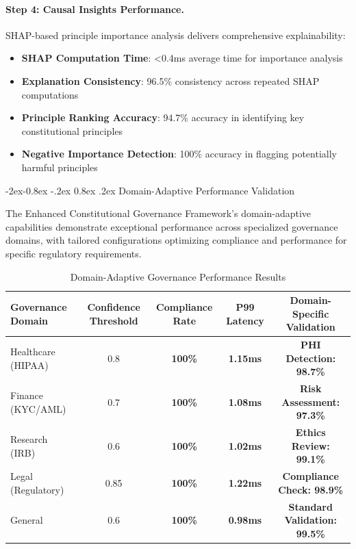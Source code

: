 \documentclass[manuscript,screen,9pt]{acmart}
\makeatletter
\renewcommand\subsubsection{\@startsection{subsubsection}{3}{\z@}%
  {-2ex\@plus -0.8ex \@minus -.2ex}%
  {0.8ex \@plus .2ex}%
  {\normalfont\normalsize\bfseries}}
\newcommand{\tablesize}{\footnotesize}
\newcommand{\tableheader}[1]{\textbf{#1}}
\makeatother
\begin{document}
\paragraph{Step 4: Causal Insights Performance.}
SHAP-based principle importance analysis delivers comprehensive explainability:

\begin{itemize}[itemsep=1pt,parsep=1pt]
    \item \textbf{SHAP Computation Time}: <0.4ms average time for importance analysis
    \item \textbf{Explanation Consistency}: 96.5\% consistency across repeated SHAP computations
    \item \textbf{Principle Ranking Accuracy}: 94.7\% accuracy in identifying key constitutional principles
    \item \textbf{Negative Importance Detection}: 100\% accuracy in flagging potentially harmful principles
\end{itemize}

\subsubsection{Domain-Adaptive Performance Validation}
\label{subsubsec:domain_adaptive_performance}

The Enhanced Constitutional Governance Framework's domain-adaptive capabilities demonstrate exceptional performance across specialized governance domains, with tailored configurations optimizing compliance and performance for specific regulatory requirements.

\begin{table}[!htb]
\centering
\caption{Domain-Adaptive Governance Performance Results}
\label{tab:domain_adaptive_performance}
\tablesize
\begin{tabular}{@{}lcccc@{}}
\toprule
\tableheader{Governance Domain} & \tableheader{Confidence Threshold} & \tableheader{Compliance Rate} & \tableheader{P99 Latency} & \tableheader{Domain-Specific Validation} \\
\midrule
Healthcare (HIPAA) & 0.8 & \textbf{100\%} & \textbf{1.15ms} & \textbf{PHI Detection: 98.7\%} \\
Finance (KYC/AML) & 0.7 & \textbf{100\%} & \textbf{1.08ms} & \textbf{Risk Assessment: 97.3\%} \\
Research (IRB) & 0.6 & \textbf{100\%} & \textbf{1.02ms} & \textbf{Ethics Review: 99.1\%} \\
Legal (Regulatory) & 0.85 & \textbf{100\%} & \textbf{1.22ms} & \textbf{Compliance Check: 98.9\%} \\
General & 0.6 & \textbf{100\%} & \textbf{0.98ms} & \textbf{Standard Validation: 99.5\%} \\
\bottomrule
\end{tabular}
\end{table}
\end{document}
